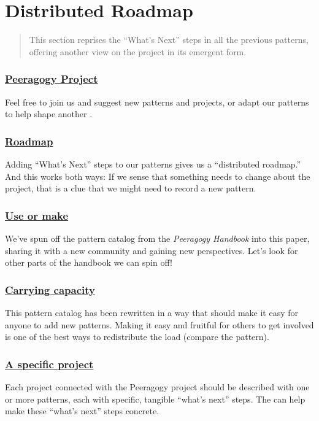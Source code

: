 \section{Distributed Roadmap} \label{sec:Distributed_Roadmap}

\begin{quote}
This section reprises the ``What's Next'' steps in all the previous
patterns, offering another view on the project 
in its emergent form.
\end{quote}

\subsubsection*{\hyperref[sec:Peeragogy_Project]{Peeragogy Project}} Feel free to join us and suggest new patterns and projects, or adapt our patterns to help shape another .

\subsubsection*{\hyperref[sec:Roadmap]{Roadmap}} Adding ``What's Next'' steps to our patterns gives us a ``distributed roadmap.''  And this works both ways: If we sense that something needs to change about the project, that is a clue that we might need to record a new pattern.

\subsubsection*{\hyperref[sec:Use_or_make]{Use or make}} 
We've spun off the pattern catalog from the \emph{Peeragogy Handbook} into this paper, sharing it with a new community and gaining new perspectives.  Let's look for other parts of the handbook we can spin off!

\subsubsection*{\hyperref[sec:Carrying_capacity]{Carrying capacity}} This pattern catalog has been rewritten in a way that should make it
easy for anyone to add new patterns. Making it easy and fruitful for
others to get involved is one of the best ways to redistribute the load
(compare the  pattern).

\subsubsection*{\hyperref[sec:A_specific_project]{A specific project}}
 Each project connected with the Peeragogy project should be described with one or more patterns, each with specific, tangible ``what's next'' steps.  The  can help make these ``what's next'' steps concrete.

